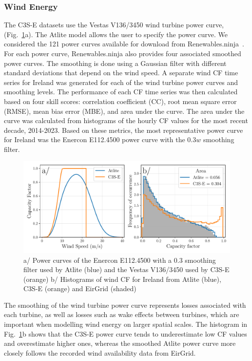 \documentclass[a4paper, 11pt]{article}
\begin{document}
\subsubsection{Wind Energy}
\label{sec:wind_verification}

The C3S-E datasets use the Vestas V136/3450 wind turbine power curve, (Fig.~\ref{fig:power_curve}a). The Atlite model allows the user to specify the power curve. We considered the 121 power curves available for download from Renewables.ninja~\cite{staffell2016wake}. For each power curve, Renewables.ninja also provides four associated smoothed power curves. The smoothing is done using a Gaussian filter with different standard deviations that depend on the wind speed. A separate wind CF time series for Ireland was generated for each of the wind turbine power curves and smoothing levels. The performance of each CF time series was then calculated based on four skill scores: correlation coefficient (CC), root mean square error (RMSE), mean bias error (MBE), and area under the curve. The area under the curve was calculated from histograms of the hourly CF values for the most recent decade, 2014-2023. Based on these metrics, the most representative power curve for Ireland was the Enercon E112.4500 power curve with the $0.3w$  smoothing filter.

\begin{figure}[!ht]
	\centering
	\includegraphics[width=\textwidth]{verification_power_curve}
	\caption{a/ Power curves of the Enercon E112.4500 with a 0.3 smoothing filter used by Atlite (blue) and the Vestas V136/3450 used by C3S-E (orange) b/ Histograms of wind CF for Ireland from Atlite (blue), C3S-E (orange) and EirGrid (shaded)}
	\label{fig:power_curve}
\end{figure}

The smoothing of the wind turbine power curve represents losses associated with each turbine, as well as losses such as wake effects between turbines, which are important when modelling wind energy on larger spatial scales. The histogram in Fig.~\ref{fig:power_curve}b shows that the C3S-E power curve tends to underestimate low CF values and overestimate higher ones, whereas the smoothed Atlite power curve more closely follows the recorded wind availability data from EirGrid.
\end{document}
